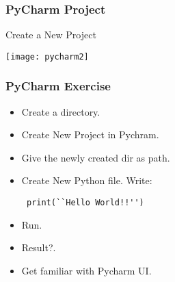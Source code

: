 \begin{frame}[fragile]\frametitle{PyCharm Project}
Create a New Project
\begin{center}
\texttt{[image: pycharm2]}
\end{center}
\end{frame}

\begin{frame}[fragile]\frametitle{PyCharm Exercise}

  \begin{itemize}
  \item Create a directory.
  \item Create New Project in Pychram. 
  \item Give the newly created dir as path.
  \item Create New Python file. Write:
    \begin{lstlisting}
 print(``Hello World!!'')
    \end{lstlisting}
  \item Run.
  \item Result?.
  \item Get familiar with Pycharm UI.
  \end{itemize}
\end{frame}


